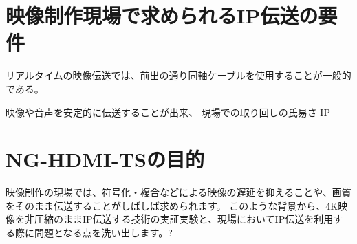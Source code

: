 \section{映像制作現場で求められるIP伝送の要件}

リアルタイムの映像伝送では、前出の通り同軸ケーブルを使用することが一般的である。

映像や音声を安定的に伝送することが出来、
現場での取り回しの氏易さ
IP


\section{NG-HDMI-TSの目的}

映像制作の現場では、符号化・複合などによる映像の遅延を抑えることや、画質をそのまま伝送することがしばしば求められます。
このような背景から、4K映像を非圧縮のままIP伝送する技術の実証実験と、現場においてIP伝送を利用する際に問題となる点を洗い出します。?

